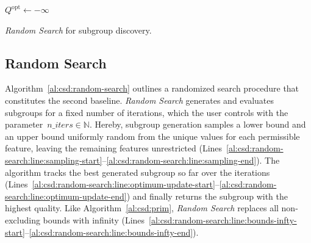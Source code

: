 \documentclass{article}
\theoremstyle{definition}
\begin{document}
\begin{algorithm}[t]
	\DontPrintSemicolon
	\BlankLine
	$Q^{\text{opt}} \leftarrow - \infty$\;
	\caption{\emph{Random Search} for subgroup discovery.}
	\label{al:csd:random-search}
\end{algorithm}

\subsection{Random Search}
\label{sec:csd:baselines:random-search}

Algorithm~\ref{al:csd:random-search} outlines a randomized search procedure that constitutes the second baseline.
\emph{Random Search} generates and evaluates subgroups for a fixed number of iterations, which the user controls with the parameter~$\mathit{n\_iters} \in \mathbb{N}$.
Hereby, subgroup generation samples a lower bound and an upper bound uniformly random from the unique values for each permissible feature, leaving the remaining features unrestricted (Lines~\ref{al:csd:random-search:line:sampling-start}--\ref{al:csd:random-search:line:sampling-end}).
The algorithm tracks the best generated subgroup so far over the iterations (Lines~\ref{al:csd:random-search:line:optimum-update-start}--\ref{al:csd:random-search:line:optimum-update-end}) and finally returns the subgroup with the highest quality.
Like Algorithm~\ref{al:csd:prim}, \emph{Random Search} replaces all non-excluding bounds with infinity (Lines~\ref{al:csd:random-search:line:bounds-infty-start}--\ref{al:csd:random-search:line:bounds-infty-end}).
\end{document}
